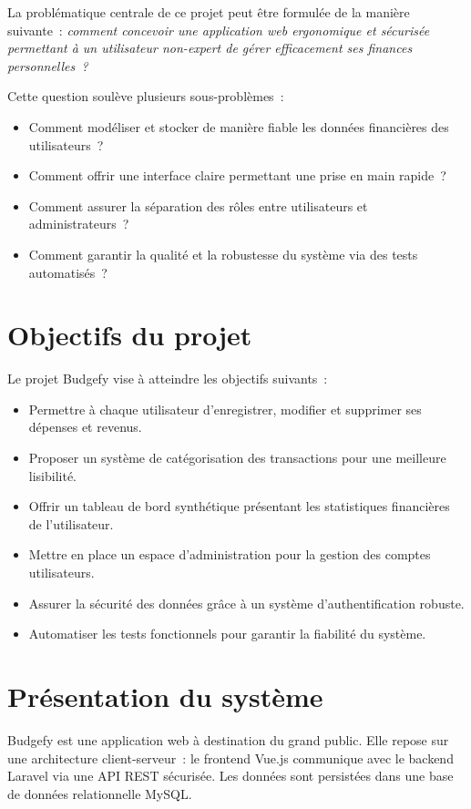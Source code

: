 \documentclass{rapportPFA}
\begin{document}
La probl\'ematique centrale de ce projet peut \^etre formul\'ee de la mani\`ere suivante~:
\textit{comment concevoir une application web ergonomique et s\'ecuris\'ee permettant \`a
un utilisateur non-expert de g\'erer efficacement ses finances personnelles~?}

Cette question soul\`eve plusieurs sous-probl\`emes~:
\begin{itemize}
    \item Comment mod\'eliser et stocker de mani\`ere fiable les donn\'ees financi\`eres des utilisateurs~?
    \item Comment offrir une interface claire permettant une prise en main rapide~?
    \item Comment assurer la s\'eparation des r\^oles entre utilisateurs et administrateurs~?
    \item Comment garantir la qualit\'e et la robustesse du syst\`eme via des tests automatis\'es~?
\end{itemize}

\section{Objectifs du projet}

Le projet Budgefy vise \`a atteindre les objectifs suivants~:
\begin{itemize}
    \item Permettre \`a chaque utilisateur d'enregistrer, modifier et supprimer ses d\'epenses et revenus.
    \item Proposer un syst\`eme de cat\'egorisation des transactions pour une meilleure lisibilit\'e.
    \item Offrir un tableau de bord synth\'etique pr\'esentant les statistiques financi\`eres de l'utilisateur.
    \item Mettre en place un espace d'administration pour la gestion des comptes utilisateurs.
    \item Assurer la s\'ecurit\'e des donn\'ees gr\^ace \`a un syst\`eme d'authentification robuste.
    \item Automatiser les tests fonctionnels pour garantir la fiabilit\'e du syst\`eme.
\end{itemize}

\section{Pr\'esentation du syst\`eme}

Budgefy est une application web \`a destination du grand public. Elle repose sur une
architecture client-serveur~: le frontend Vue.js communique avec le backend Laravel via
une API REST s\'ecuris\'ee. Les donn\'ees sont persist\'ees dans une base de donn\'ees
relationnelle MySQL.
\end{document}
